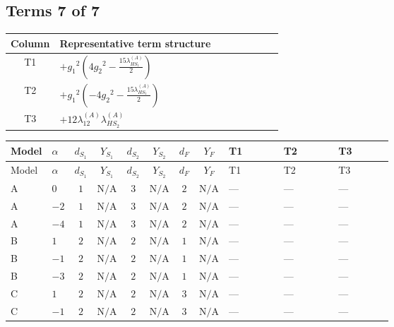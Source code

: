 \documentclass[8pt]{article}
\begin{document}
\begin{landscape}
\subsection*{Terms 7 of 7}
\begin{center}
\begin{tabular}{@{}c >{\raggedright\arraybackslash}p{0.82\linewidth}@{}}
\toprule
Column & Representative term structure \\
\midrule
T1 & \(\displaystyle +{g_1}^2 \left(4 {g_2}^2-\frac{15 {\lambda_{HS_1}^{(A)}}}{2}\right)\) \\
\midrule
T2 & \(\displaystyle +{g_1}^2 \left(-4 {g_2}^2-\frac{15 {\lambda_{HS_1}^{(A)}}}{2}\right)\) \\
\midrule
T3 & \(\displaystyle +12 {\lambda_{12}^{(A)}} {\lambda_{HS_2}^{(A)}}\) \\
\midrule
\bottomrule
\end{tabular}
\end{center}
\smallskip
\tiny
\begin{longtable}{@{}llcccccc >{\raggedright\arraybackslash}p{0.21\linewidth} >{\raggedright\arraybackslash}p{0.21\linewidth} >{\raggedright\arraybackslash}p{0.21\linewidth}@{}}
\toprule
Model & $\alpha$ & $d_{S_1}$ & $Y_{S_1}$ & $d_{S_2}$ & $Y_{S_2}$ & $d_F$ & $Y_F$ & T1 & T2 & T3 \\
\midrule
\endfirsthead
\toprule
Model & $\alpha$ & $d_{S_1}$ & $Y_{S_1}$ & $d_{S_2}$ & $Y_{S_2}$ & $d_F$ & $Y_F$ & T1 & T2 & T3 \\
\midrule
\endhead
A & $0$ & $1$ & $\text{N/A}$ & $3$ & $\text{N/A}$ & $2$ & $\text{N/A}$ & --- & --- & --- \\
\midrule
A & $-2$ & $1$ & $\text{N/A}$ & $3$ & $\text{N/A}$ & $2$ & $\text{N/A}$ & --- & --- & --- \\
\midrule
A & $-4$ & $1$ & $\text{N/A}$ & $3$ & $\text{N/A}$ & $2$ & $\text{N/A}$ & --- & --- & --- \\
\midrule
B & $1$ & $2$ & $\text{N/A}$ & $2$ & $\text{N/A}$ & $1$ & $\text{N/A}$ & --- & --- & --- \\
\midrule
B & $-1$ & $2$ & $\text{N/A}$ & $2$ & $\text{N/A}$ & $1$ & $\text{N/A}$ & --- & --- & --- \\
\midrule
B & $-3$ & $2$ & $\text{N/A}$ & $2$ & $\text{N/A}$ & $1$ & $\text{N/A}$ & --- & --- & --- \\
\midrule
C & $1$ & $2$ & $\text{N/A}$ & $2$ & $\text{N/A}$ & $3$ & $\text{N/A}$ & --- & --- & --- \\
\midrule
C & $-1$ & $2$ & $\text{N/A}$ & $2$ & $\text{N/A}$ & $3$ & $\text{N/A}$ & --- & --- & --- \\

\end{longtable}
\end{landscape}
\end{document}
